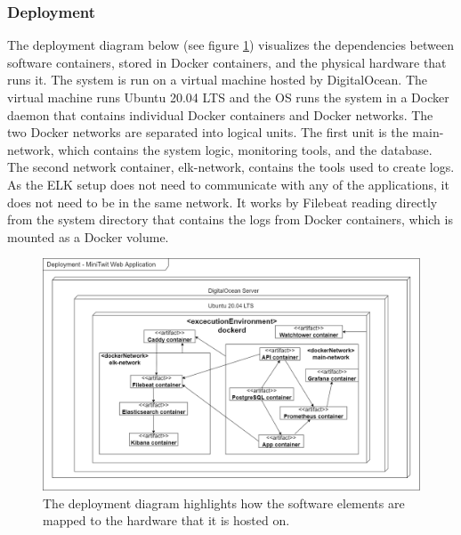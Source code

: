 \newpage

\subsubsection{Deployment}
The deployment diagram below (see figure \ref{fig:deployment_diagram}) visualizes the dependencies between software containers, stored in Docker containers, and the physical hardware that runs it. The system is run on a virtual machine hosted by DigitalOcean. The virtual machine runs Ubuntu 20.04 LTS and the OS runs the system in a Docker daemon that contains individual Docker containers and Docker networks. 
\newline
The two Docker networks are separated into logical units. The first unit is the main-network, which contains the system logic, monitoring tools, and the database. The second network container, elk-network, contains the tools used to create logs. As the ELK setup does not need to communicate with any of the applications, it does not need to be in the same network. It works by Filebeat reading directly from the system directory that contains the logs from Docker containers, which is mounted as a Docker volume.

\begin{figure}[H]
    \centering
    \includegraphics[scale=0.37]{images/deployment_diagram.png}
    \caption{The deployment diagram highlights how the software elements are mapped to the hardware that it is hosted on.}
    \label{fig:deployment_diagram}
\end{figure}

\newpage


